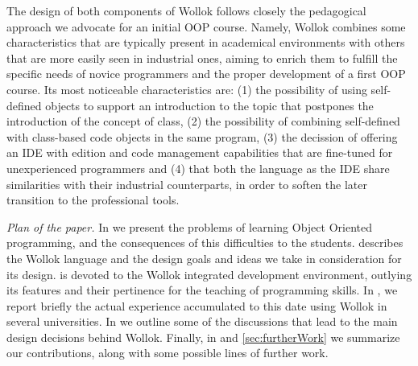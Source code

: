 The design of both components of Wollok follows closely the pedagogical approach we advocate for an initial OOP course. 
Namely, Wollok combines some characteristics that are typically present in academical environments with others that are more easily seen in industrial ones, aiming to enrich them to fulfill the specific needs of novice programmers and the proper development of a first OOP course.
Its most noticeable characteristics are:
(1) the possibility of using self-defined objects to support an introduction to the topic that postpones the introduction of the concept of class,
(2) the possibility of combining self-defined with class-based code objects in the same program,
(3) the decission of offering an IDE with edition and code management capabilities that are fine-tuned for unexperienced programmers
and (4) that both the language as the IDE share similarities with their industrial counterparts, in order to soften the later transition to the professional tools.

\medskip 
\emph{Plan of the paper.}
In  we present the problems of learning Object Oriented programming, and the consequences of this difficulties to the students. 
 describes the Wollok language and the design goals and ideas we take in consideration for its design. 
 is devoted to the Wollok integrated development environment, outlying its features and their pertinence for the teaching of programming skills. 
In , we report briefly the actual experience accumulated to this date using Wollok in several universities.
In  we outline some of the discussions that lead to the main design decisions behind Wollok.
Finally, in  and \ref{sec:furtherWork} we summarize our contributions, along with some possible lines of further work. 


